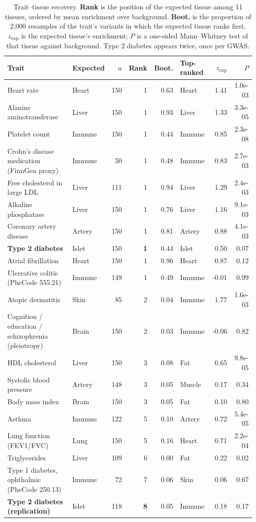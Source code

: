 \begin{table}[htbp]\centering\footnotesize\setlength{\tabcolsep}{4pt}
\caption{Trait--tissue recovery. \textbf{Rank} is the position of the expected tissue among 11 tissues, ordered by mean enrichment over background. \textbf{Boot.} is the proportion of 2{,}000 resamples of the trait's variants in which the expected tissue ranks first. $z_{\text{exp}}$ is the expected tissue's enrichment; $P$ is a one-sided Mann--Whitney test of that tissue against background. Type 2 diabetes appears twice, once per GWAS.}\label{tab:results}
\begin{tabular}{llrrrlrr}\toprule
Trait & Expected & $n$ & Rank & Boot. & Top-ranked & $z_{\text{exp}}$ & $P$ \\ \midrule
Heart rate & Heart & 150 & 1 & 0.63 & Heart & 1.41 & 1.0e-03 \\
Alanine aminotransferase & Liver & 150 & 1 & 0.93 & Liver & 1.33 & 3.3e-05 \\
Platelet count & Immune & 150 & 1 & 0.44 & Immune & 0.85 & 2.3e-08 \\
Crohn's disease medication (FinnGen proxy) & Immune & 50 & 1 & 0.48 & Immune & 0.83 & 2.7e-03 \\
Free cholesterol in large LDL & Liver & 111 & 1 & 0.94 & Liver & 1.29 & 2.4e-03 \\
Alkaline phosphatase & Liver & 150 & 1 & 0.76 & Liver & 1.16 & 9.1e-03 \\
Coronary artery disease & Artery & 150 & 1 & 0.81 & Artery & 0.88 & 4.1e-03 \\
\textbf{Type 2 diabetes} & Islet & 150 & \textbf{1} & 0.44 & Islet & 0.50 & 0.07 \\
Atrial fibrillation & Heart & 150 & 1 & 0.96 & Heart & 0.87 & 0.12 \\
Ulcerative colitis (PheCode 555.21) & Immune & 149 & 1 & 0.49 & Immune & -0.01 & 0.99 \\
Atopic dermatitis & Skin & 85 & 2 & 0.04 & Immune & 1.77 & 1.6e-03 \\
Cognition / education / schizophrenia (pleiotropy) & Brain & 150 & 2 & 0.03 & Immune & -0.06 & 0.82 \\
HDL cholesterol & Liver & 150 & 3 & 0.08 & Fat & 0.65 & 9.8e-05 \\
Systolic blood pressure & Artery & 148 & 3 & 0.05 & Muscle & 0.17 & 0.34 \\
Body mass index & Brain & 150 & 3 & 0.05 & Fat & 0.10 & 0.80 \\
Asthma & Immune & 122 & 5 & 0.10 & Artery & 0.72 & 5.4e-05 \\
Lung function (FEV1/FVC) & Lung & 150 & 5 & 0.16 & Heart & 0.71 & 2.2e-04 \\
Triglycerides & Liver & 109 & 6 & 0.00 & Fat & 0.22 & 0.02 \\
Type 1 diabetes, ophthalmic (PheCode 250.13) & Immune & 72 & 7 & 0.06 & Skin & 0.06 & 0.67 \\
\textbf{Type 2 diabetes (replication)} & Islet & 118 & \textbf{8} & 0.05 & Immune & 0.18 & 0.17 \\
\bottomrule\end{tabular}\end{table}